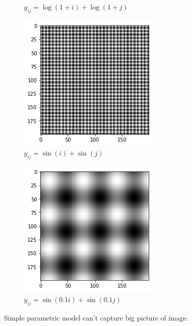 \documentclass{beamer}
\begin{document}
\begin{frame}
\begin{figure}[htb]
\begin{subfigure}[b]{0.24\linewidth}
        \caption{$y_{ij} = \log(1+i)+\log(1+j)$}
      \end{subfigure}
      \begin{subfigure}[b]{0.24\linewidth}
        \includegraphics[width=\linewidth]{images/parametric_model_3.png}
        \caption{$y_{ij} = \sin(i)+\sin(j)$}
      \end{subfigure}
      \begin{subfigure}[b]{0.24\linewidth}
        \includegraphics[width=\linewidth]{images/parametric_model_4.png}
        \caption{$y_{ij} = \sin(0.1i)+\sin(0.1j)$}
      \end{subfigure}
      \caption{Simple parametric model can't capture big picture of image.}
      \label{fig:parametric_model}
    \end{figure}
\end{frame}
\end{document}
